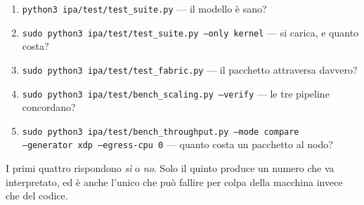 \documentclass[11pt,a4paper,oneside]{report}
\begin{document}
\begin{enumerate}
\item \texttt{python3 ipa/test/test\_suite.py} --- il modello è sano?
\item \texttt{sudo python3 ipa/test/test\_suite.py --only kernel} --- si carica,
      e quanto costa?
\item \texttt{sudo python3 ipa/test/test\_fabric.py} --- il pacchetto attraversa
      davvero?
\item \texttt{sudo python3 ipa/test/bench\_scaling.py --verify} --- le tre
      pipeline concordano?
\item \texttt{sudo python3 ipa/test/bench\_throughput.py --mode compare}\\
      \texttt{--generator xdp --egress-cpu 0} --- quanto costa un pacchetto al nodo?
\end{enumerate}

I primi quattro rispondono \emph{sì} o \emph{no}. Solo il quinto produce un
numero che va interpretato, ed è anche l'unico che può fallire per colpa della
macchina invece che del codice.
\end{document}
